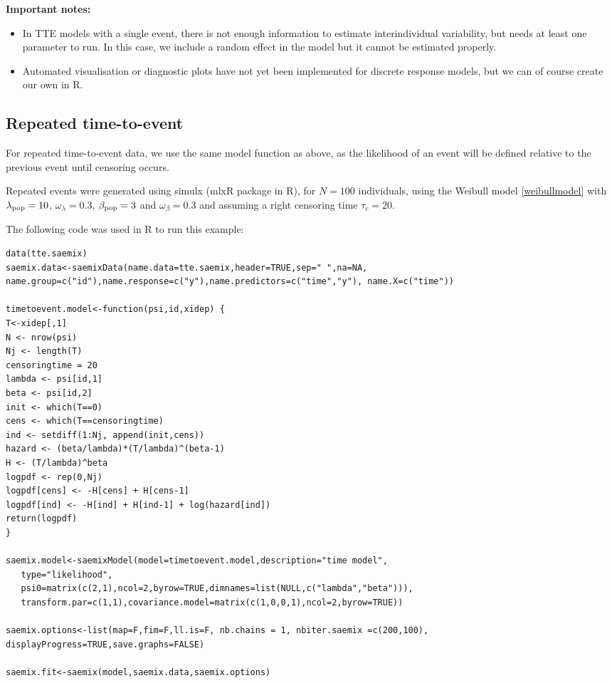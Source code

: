 {\bf Important notes:}
\begin{itemize}
\item In TTE models with a single event, there is not enough information to estimate interindividual variability, but \monolix needs at least one parameter to run. In this case, we include a random effect in the model but it cannot be estimated properly.
\item Automated visualisation or diagnostic plots have not yet been implemented for discrete response models, but we can of course create our own in R.
\end{itemize}

\paragraph{}


\subsection{Repeated time-to-event}

For repeated time-to-event data, we use the same model function as above, as the likelihood of an event will be defined relative to the previous event until censoring occurs.

Repeated events were generated using simulx (mlxR package in R), for $N=100$ individuals, using the Weibull model \eqref{weibullmodel} with $\lambda_{\rm pop} = 10$, $\omega_{\lambda} = 0.3$, $\beta_{\rm pop} = 3$ and $\omega_{\beta} = 0.3$ and assuming a right censoring time $\tau_c = 20$.

The following code was used in R to run this example:

\begin{verbatim}
data(tte.saemix)
saemix.data<-saemixData(name.data=tte.saemix,header=TRUE,sep=" ",na=NA, name.group=c("id"),name.response=c("y"),name.predictors=c("time","y"), name.X=c("time"))

timetoevent.model<-function(psi,id,xidep) {
T<-xidep[,1]
N <- nrow(psi)
Nj <- length(T)
censoringtime = 20
lambda <- psi[id,1]
beta <- psi[id,2]
init <- which(T==0)
cens <- which(T==censoringtime)
ind <- setdiff(1:Nj, append(init,cens))
hazard <- (beta/lambda)*(T/lambda)^(beta-1)
H <- (T/lambda)^beta
logpdf <- rep(0,Nj)
logpdf[cens] <- -H[cens] + H[cens-1]
logpdf[ind] <- -H[ind] + H[ind-1] + log(hazard[ind])
return(logpdf)
}

saemix.model<-saemixModel(model=timetoevent.model,description="time model",
   type="likelihood",
   psi0=matrix(c(2,1),ncol=2,byrow=TRUE,dimnames=list(NULL,c("lambda","beta"))),
   transform.par=c(1,1),covariance.model=matrix(c(1,0,0,1),ncol=2,byrow=TRUE))

saemix.options<-list(map=F,fim=F,ll.is=F, nb.chains = 1, nbiter.saemix =c(200,100), displayProgress=TRUE,save.graphs=FALSE)

saemix.fit<-saemix(model,saemix.data,saemix.options)

\end{verbatim}

